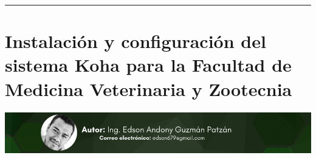 \documentclass[12pt,spanish,Letterpaper,openany]{book}
\newcommand{\HRule}{\begin{center}\rule{0.5\linewidth}{0.2mm}\end{center}}
\begin{document}
\medskip

\HRule

\medskip

\hypertarget{article05}{%
\chapter{Instalación y configuración del sistema Koha para la Facultad de Medicina Veterinaria y Zootecnia}\label{article05}}

\begin{center}\includegraphics[width=1\linewidth]{images/edson} \end{center}
\end{document}
